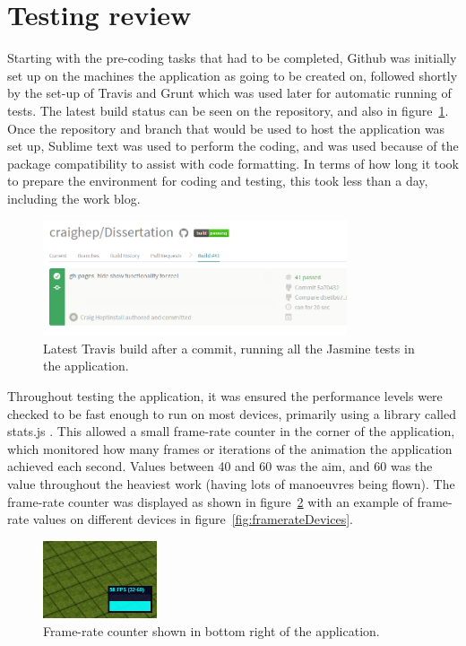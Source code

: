 \section{Testing review}
Starting with the pre-coding tasks that had to be completed, Github was initially set up on the machines the application as going to be created on, followed shortly by the set-up of Travis and Grunt which was used later for automatic running of tests. The latest build status can be seen on the repository, and also in figure~\ref{fig:travis}. Once the repository and branch that would be used to host the application was set up, Sublime text was used to perform the coding, and was used because of the package compatibility to assist with code formatting. In terms of how long it took to prepare the environment for coding and testing, this took less than a day, including the work blog.

\begin{figure}[h!]
  \centering
      \includegraphics[width=0.8\textwidth]{images/travis.png}
  \caption{Latest Travis build after a commit, running all the Jasmine tests in the application.}
  \label{fig:travis}
\end{figure}

Throughout testing the application, it was ensured the performance levels were checked to be fast enough to run on most devices, primarily using a library called stats.js \cite{stats}. This allowed a small frame-rate counter in the corner of the application, which monitored how many frames or iterations of the animation the application achieved each second. Values between 40 and 60 was the aim, and 60 was the value throughout the heaviest work (having lots of manoeuvres being flown). The frame-rate counter was displayed as shown in figure~\ref{fig:framerate} with an example of frame-rate values on different devices in figure~\ref{fig:framerateDevices}.

\begin{figure}[h]
  \centering
      \includegraphics[width=0.3\textwidth]{images/framerate.png}
  \caption{Frame-rate counter shown in bottom right of the application.}
  \label{fig:framerate}
\end{figure}

